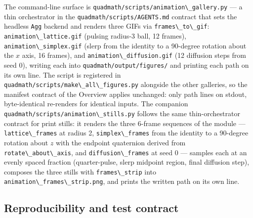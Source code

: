 \documentclass[
  10pt,
]{article}
\newcommand{\passthrough}[1]{#1}
\begin{document}
The command-line surface is
\passthrough{\lstinline!quadmath/scripts/animation\_gallery.py!} --- a
thin orchestrator in the
\passthrough{\lstinline!quadmath/scripts/AGENTS.md!} contract that sets
the headless \passthrough{\lstinline!Agg!} backend and renders three
GIFs via \passthrough{\lstinline!frames\_to\_gif!}:
\passthrough{\lstinline!animation\_lattice.gif!} (pulsing radius-3 ball,
12 frames), \passthrough{\lstinline!animation\_simplex.gif!} (slerp from
the identity to a 90-degree rotation about the \(x\) axis, 16 frames),
and \passthrough{\lstinline!animation\_diffusion.gif!} (12 diffusion
steps from seed 0), writing each into
\passthrough{\lstinline!quadmath/output/figures/!} and printing each
path on its own line. The script is registered in
\passthrough{\lstinline!quadmath/scripts/make\_all\_figures.py!}
alongside the other galleries, so the manifest contract of the Overview
applies unchanged: only path lines on stdout, byte-identical re-renders
for identical inputs. The companion
\passthrough{\lstinline!quadmath/scripts/animation\_stills.py!} follows
the same thin-orchestrator contract for print stills: it renders the
three 6-frame sequences of the module ---
\passthrough{\lstinline!lattice\_frames!} at radius 2,
\passthrough{\lstinline!simplex\_frames!} from the identity to a
90-degree rotation about \(z\) with the endpoint quaternion derived from
\passthrough{\lstinline!rotate\_about\_axis!}, and
\passthrough{\lstinline!diffusion\_frames!} at seed 0 --- samples each
at an evenly spaced fraction (quarter-pulse, slerp midpoint region,
final diffusion step), composes the three stills with
\passthrough{\lstinline!frames\_strip!} into
\passthrough{\lstinline!animation\_frames\_strip.png!}, and prints the
written path on its own line.

\subsection{Reproducibility and test
contract}\label{reproducibility-and-test-contract}
\end{document}

